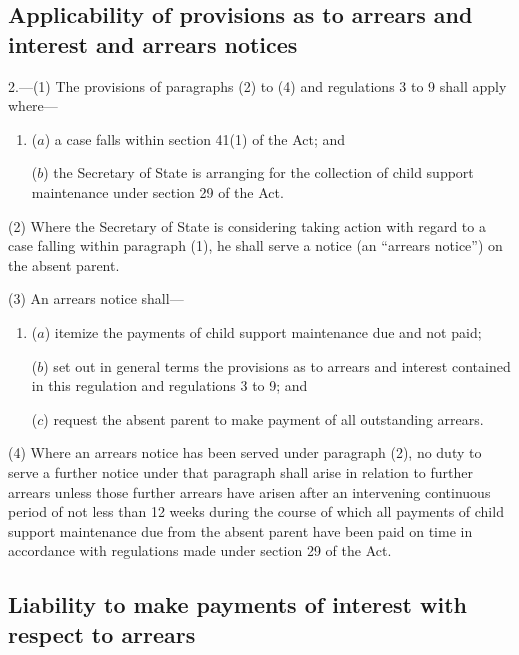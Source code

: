 \documentclass[12pt,a4paper]{article}
\begin{document}
\renewcommand\parthead{--- Part II}

\subsection[2. Applicability of provisions as to arrears and interest and arrears notices]{Applicability of provisions as to arrears and interest and arrears notices}

2.—(1) The provisions of paragraphs (2) to (4) and regulations 3 to 9 shall apply where—
\begin{enumerate}\item[]
($a$) a case falls within section 41(1) of the Act; and

($b$) the Secretary of State is arranging for the collection of child support maintenance under section 29 of the Act.
\end{enumerate}

(2) Where the Secretary of State is considering taking action with regard to a case falling within paragraph (1), he shall serve a notice (an “arrears notice”) on the absent parent.

(3) An arrears notice shall—
\begin{enumerate}\item[]
($a$) itemize the payments of child support maintenance due and not paid;

($b$) set out in general terms the provisions as to arrears and interest contained in this regulation and regulations 3 to 9; and

($c$) request the absent parent to make payment of all outstanding arrears.
\end{enumerate}

(4) Where an arrears notice has been served under paragraph (2), no duty to serve a further notice under that paragraph shall arise in relation to further arrears unless those further arrears have arisen after an intervening continuous period of not less than 12 weeks during the course of which all payments of child support maintenance due from the absent parent have been paid on time in accordance with regulations made under section 29 of the Act.

\subsection[3. Liability to make payments of interest with respect to arrears]{Liability to make payments of interest with respect to arrears}
\end{document}
